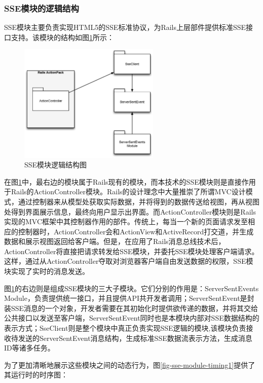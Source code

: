 \subsubsection{SSE模块的逻辑结构}
SSE模块主要负责实现HTML5的SSE标准协议，为Rails上层部件提供标准SSE接口支持。该模块的结构如图\ref{fig-sse-module}所示：

\begin{figure}[h]
\centering
\includegraphics[width=0.6\textwidth]{images/overview/sse_module.eps}
\caption{SSE模块逻辑结构图}
\label{fig-sse-module}
\end{figure}

在图\ref{fig-sse-module}中，最右边的模块属于Rails现有的模块，而本技术的SSE模块则是直接作用于Rails的ActionController模块。Rails的设计理念中大量推崇了所谓MVC设计模式，通过控制器来从模型处获取实际数据，并将得到的数据传送给视图，再从视图处得到界面展示信息，最终向用户显示出界面。而ActionController模块则是Rails实现的MVC框架中其控制器作用的部件。传统上，每当一个新的页面请求发至相应的控制器时，ActionController会和ActionView和ActiveRecord打交道，并生成数据和展示视图返回给客户端。但是，在应用了Rails消息总线技术后，ActionController将直接把请求转发给SSE模块，并委托SSE模块处理客户端请求。这样，通过从ActionController夺取对浏览器客户端自由发送数据的权限，SSE模块实现了实时的消息发送。

图\ref{fig-sse-module}的右边则是组成SSE模块的三大子模块。它们分别的作用是：ServerSentEvents Module，负责提供统一接口，并且提供API共开发者调用；ServerSentEvent是封装SSE消息的一个对象，开发者需要在其初始化时提供欲传递的数据，并将其交给公共接口以发送至客户端，ServerSentEvent同时也是本模块内部对SSE数据结构的表示方式；SseClient则是整个模块中真正负责实现SSE逻辑的模块,该模块负责接收待发送的ServerSentEvent消息结构，生成标准SSE数据流表示方法，生成消息ID等诸多任务。

为了更加清晰地展示这些模块之间的动态行为，图\ref{fig-sse-module-timing1}提供了其运行时的时序图：

